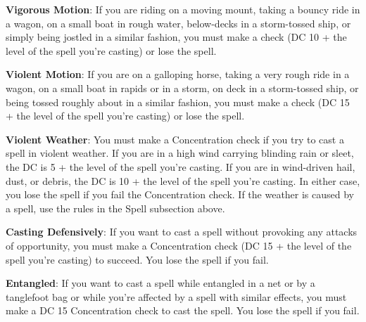 \textbf{Vigorous Motion}: If you are riding on a moving mount, taking a bouncy ride in a wagon, on a small boat in rough water, below-decks in a storm-tossed ship, or simply being jostled in a similar fashion, you must make a  check (DC 10 + the level of the spell you're casting) or lose the spell.

\textbf{Violent Motion}: If you are on a galloping horse, taking a very rough ride in a wagon, on a small boat in rapids or in a storm, on deck in a storm-tossed ship, or being tossed roughly about in a similar fashion, you must make a  check (DC 15 + the level of the spell you're casting) or lose the spell.

\textbf{Violent Weather}: You must make a Concentration check if you try to cast a spell in violent weather. If you are in a high wind carrying blinding rain or sleet, the DC is 5 + the level of the spell you're casting. If you are in wind-driven hail, dust, or debris, the DC is 10 + the level of the spell you're casting. In either case, you lose the spell if you fail the Concentration check. If the weather is caused by a spell, use the rules in the Spell subsection above.

\textbf{Casting Defensively}: If you want to cast a spell without provoking any attacks of opportunity, you must make a Concentration check (DC 15 + the level of the spell you're casting) to succeed. You lose the spell if you fail.

\textbf{Entangled}: If you want to cast a spell while entangled in a net or by a tanglefoot bag or while you're affected by a spell with similar effects, you must make a DC 15 Concentration check to cast the spell. You lose the spell if you fail.